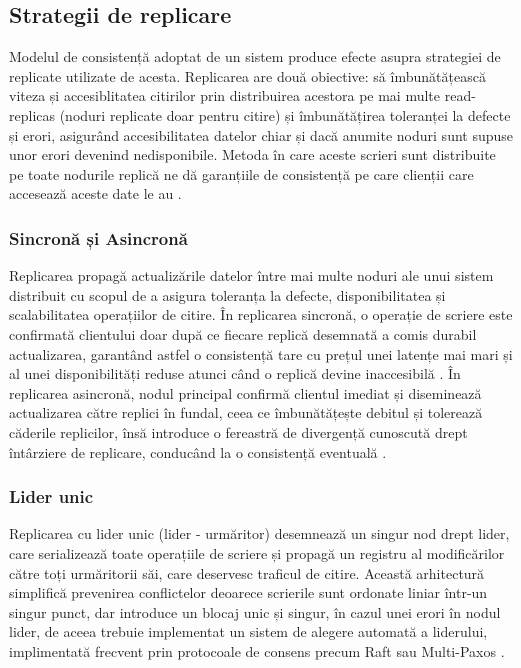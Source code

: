 \subsection{Strategii de replicare}

Modelul de consistență adoptat de un sistem produce efecte asupra strategiei de replicate utilizate de acesta. Replicarea are două obiective: să îmbunătățească viteza și accesiblitatea citirilor prin distribuirea acestora pe mai multe read-replicas (noduri replicate doar pentru citire) și îmbunătățirea toleranței la defecte și erori, asigurând accesibilitatea datelor chiar și dacă anumite noduri sunt supuse unor erori devenind nedisponibile. Metoda în care aceste scrieri sunt distribuite pe toate nodurile replică ne dă garanțiile de consistență pe care clienții care accesează aceste date le au \cite{gray1996}.

\subsubsection{Sincronă și Asincronă}

Replicarea propagă actualizările datelor între mai multe noduri ale unui sistem distribuit cu scopul de a asigura toleranța la defecte, disponibilitatea și scalabilitatea operațiilor de citire. În replicarea sincronă, o operație de scriere este confirmată clientului doar după ce fiecare replică desemnată a comis durabil actualizarea, garantând astfel o consistență tare cu prețul unei latențe mai mari și al unei disponibilități reduse atunci când o replică devine inaccesibilă \cite{vogels2009}. În replicarea asincronă, nodul principal confirmă clientul imediat și diseminează actualizarea către replici în fundal, ceea ce îmbunătățește debitul și tolerează căderile replicilor, însă introduce o fereastră de divergență cunoscută drept întârziere de replicare, conducând la o consistență eventuală \cite{vogels2009}.

\subsubsection{Lider unic}

Replicarea cu lider unic (lider - urmăritor) desemnează un singur nod drept lider, care serializează toate operațiile de scriere și propagă un registru al modificărilor către toți urmăritorii săi, care deservesc traficul de citire. Această arhitectură simplifică prevenirea conflictelor deoarece scrierile sunt ordonate liniar într-un singur punct, dar introduce un blocaj unic și singur, în cazul unei erori în nodul lider, de aceea trebuie implementat un sistem de alegere automată a liderului, implimentată frecvent prin protocoale de consens precum Raft sau Multi-Paxos \cite{ongaro2014}.

